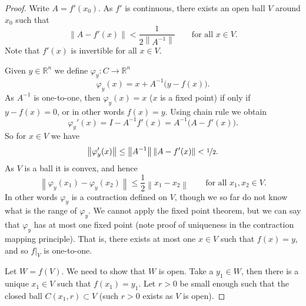 \documentclass[12pt]{book}
\newcommand{\norm}[1]{\left\lVert {#1} \right\rVert}
\newcommand{\R}{{\mathbb{R}}}
\theoremstyle{plain}
\theoremstyle{remark}
\theoremstyle{definition}
\theoremstyle{exercise}
\theoremstyle{example}
\begin{document}
\begin{proof}
Write $A = f'(x_0)$.  As $f'$ is continuous, there exists an open ball
$V$ around $x_0$ such that
\begin{equation*}
\norm{A-f'(x)} < \frac{1}{2\norm{A^{-1}}}
\qquad \text{for all $x \in V$.}
\end{equation*}
Note that $f'(x)$ is invertible for all $x \in V$.

Given $y \in \R^n$ we define $\varphi_y \colon C \to \R^n$
\begin{equation*}
\varphi_y (x) = x + A^{-1}\bigl(y-f(x)\bigr) .
\end{equation*}
As $A^{-1}$ is one-to-one,
then $\varphi_y(x) = x$ ($x$ is a fixed point) if only if
$y-f(x) = 0$, or in other words $f(x)=y$.  Using chain rule we obtain
\begin{equation*}
\varphi_y'(x) = I - A^{-1} f'(x) = A^{-1} \bigl( A-f'(x) \bigr) .
\end{equation*}
So for $x \in V$ we have
\begin{equation*}
\norm{\varphi_y'(x)} \leq \norm{A^{-1}} \norm{A-f'(x)} < \nicefrac{1}{2} .
\end{equation*}
As $V$ is a ball it is convex, and hence
\begin{equation*}
\norm{\varphi_y(x_1)-\varphi_y(x_2)} \leq \frac{1}{2} \norm{x_1-x_2} 
\qquad
\text{for all $x_1,x_2 \in V$}.
\end{equation*}
In other words $\varphi_y$ is a contraction defined on $V$, though we so far
do not know what is the range of $\varphi_y$.  We cannot apply the fixed
point theorem, but we can say that $\varphi_y$ 
has at most one fixed point (note proof of uniqueness in the contraction
mapping principle).  That is, there exists at most one $x \in V$
such that $f(x) = y$, and so $f|_V$ is one-to-one.

Let $W = f(V)$.  We need to show that $W$ is open.  Take a $y_1 \in W$,
then there is a unique $x_1 \in V$ such that $f(x_1) = y_1$.
Let $r > 0$ be small enough such that the closed ball $C(x_1,r) \subset V$
(such $r > 0$ exists as $V$ is open).


\end{proof}
\end{document}

